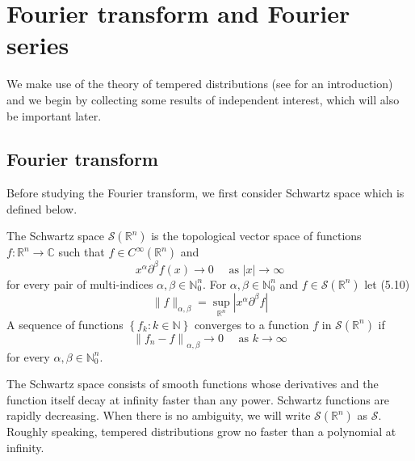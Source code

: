 \section{Fourier transform and Fourier series}
We make use of the theory of tempered distributions (see
\cite{strichartz2003guide} for an introduction)
and we begin by collecting some results of independent interest, which
will also be important later. 
\subsection{Fourier transform}
Before studying the Fourier transform, we first consider Schwartz space which is defined below.
\begin{definition} \label{def:schwarz}
The Schwartz space $\mathcal{S}\left(\mathbb{R}^{n}\right)$ is the topological vector space of functions $f: \mathbb{R}^{n} \rightarrow \mathbb{C}$ such that $f \in C^{\infty}\left(\mathbb{R}^{n}\right)$ and
$$
x^{\alpha} \partial^{\beta} f(x) \rightarrow 0 \quad \text { as }|x| \rightarrow \infty
$$
for every pair of multi-indices $\alpha, \beta \in \mathbb{N}_{0}^{n} .$ For $\alpha, \beta \in \mathbb{N}_{0}^{n}$ and $f \in \mathcal{S}\left(\mathbb{R}^{n}\right)$ let
(5.10)
$$
\|f\|_{\alpha, \beta}=\sup _{\mathbb{R}^{n}}\left|x^{\alpha} \partial^{\beta} f\right|
$$
A sequence of functions $\left\{f_{k}: k \in \mathbb{N}\right\}$ converges to a function $f$ in $\mathcal{S}\left(\mathbb{R}^{n}\right)$ if
$$
\left\|f_{n}-f\right\|_{\alpha, \beta} \rightarrow 0 \quad \text { as } k \rightarrow \infty
$$
for every $\alpha, \beta \in \mathbb{N}_{0}^{n}$.
\end{definition}
The Schwartz space consists of smooth functions whose derivatives and the function itself decay at infinity faster than any power. Schwartz functions are rapidly decreasing. When there is no ambiguity, we will write $\mathcal{S}\left(\mathbb{R}^{n}\right)$ as $\mathcal{S}$.
Roughly speaking, tempered distributions grow no faster than a polynomial at infinity.

